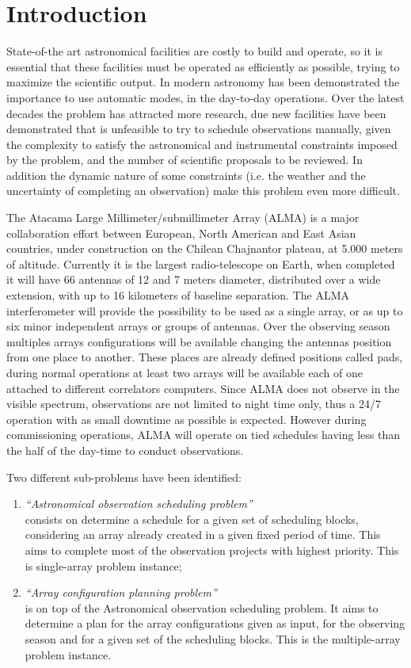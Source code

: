 \chapter{Introduction}

State-of-the art astronomical facilities are costly to build and operate, so it is essential that these facilities 
must be operated as efficiently as possible, trying to maximize the scientific output. In modern astronomy has been
demonstrated the importance to use automatic modes, in the day-to-day operations.
Over the latest decades the problem has attracted more research, due new facilities have been
demonstrated that is unfeasible to try to schedule observations manually, given the complexity to satisfy
the astronomical and instrumental constraints imposed by the problem, and the number of scientific
proposals to be reviewed. In addition the dynamic nature of some constraints (i.e. the weather and
the uncertainty of completing an observation) make this problem even more difficult.

The Atacama Large Millimeter/submillimeter Array (ALMA) is a major collaboration effort between
European, North American and East Asian countries, under construction on the Chilean Chajnantor
plateau, at 5.000 meters of altitude. Currently it is the largest radio-telescope on Earth, when completed it
will have 66 antennas of 12 and 7 meters diameter, distributed over a wide extension, with up to 16 kilometers
of baseline separation. The ALMA interferometer will provide the possibility to be used as a single
array, or as up to six minor independent arrays or groups of antennas. Over the observing season
multiples arrays configurations will be available changing the antennas position from one place to
another. These places are already defined positions called pads, during normal operations at least two
arrays will be available each of one attached to different correlators computers. Since ALMA does not
observe in the visible spectrum, observations are not limited to night time only, thus a 24/7 operation
with as small downtime as possible is expected. However during commissioning operations, ALMA will operate on tied schedules having less than the half of the day-time to conduct observations.

Two different sub-problems have been identified: 
\begin{enumerate}
\item \textit{``Astronomical observation scheduling problem''}  \hfill \\
consists on determine a schedule for a given set of scheduling blocks, considering an array already created in a given fixed
period of time. This aims to complete most of the observation projects with highest priority. This is single-array problem instance;

\item \textit{``Array configuration planning problem''} \hfill \\
is on top of the Astronomical observation scheduling problem. It aims to determine a plan for the array configurations given as input,
for the observing season and for a given set of the scheduling blocks. This is the multiple-array problem instance.
\end{enumerate}


